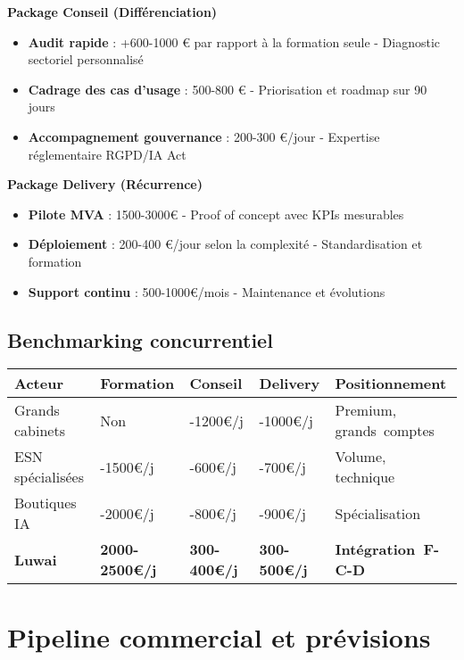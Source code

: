\textbf{Package Conseil (Différenciation)}
\begin{itemize}
    \item \textbf{Audit rapide} : +600-1000 € par rapport à la formation seule - Diagnostic sectoriel personnalisé
    \item \textbf{Cadrage des cas d'usage} : 500-800 € - Priorisation et roadmap sur 90 jours
    \item \textbf{Accompagnement gouvernance} : 200-300 €/jour - Expertise réglementaire RGPD/IA Act
\end{itemize}

\textbf{Package Delivery (Récurrence)}
\begin{itemize}
    \item \textbf{Pilote MVA} : 1500-3000€ - Proof of concept avec KPIs mesurables
    \item \textbf{Déploiement} : 200-400 €/jour selon la complexité - Standardisation et formation
    \item \textbf{Support continu} : 500-1000€/mois - Maintenance et évolutions
\end{itemize}

\subsection{Benchmarking concurrentiel}

\begin{longtable}{@{}>{\raggedright\arraybackslash}p{3.5cm}>{\raggedright\arraybackslash}p{2.8cm}>{\raggedright\arraybackslash}p{2.8cm}>{\raggedright\arraybackslash}p{2.8cm}>{\raggedright\arraybackslash}p{3.5cm}@{}}
\toprule
\textbf{Acteur} & \textbf{Formation} & \textbf{Conseil} & \textbf{Delivery} & \textbf{Positionnement} \\
\midrule
Grands cabinets & Non & 800-1200€/j & 600-1000€/j & Premium, grands~comptes \\
ESN spécialisées & 1000-1500€/j & 400-600€/j & 400-700€/j & Volume, technique \\
Boutiques IA & 1500-2000€/j & 500-800€/j & 500-900€/j & Spécialisation \\
\textbf{Luwai} & \textbf{2000-2500€/j} & \textbf{300-400€/j} & \textbf{300-500€/j} & \textbf{Intégration~F-C-D} \\
\bottomrule
\end{longtable}

\section{Pipeline commercial et prévisions}

